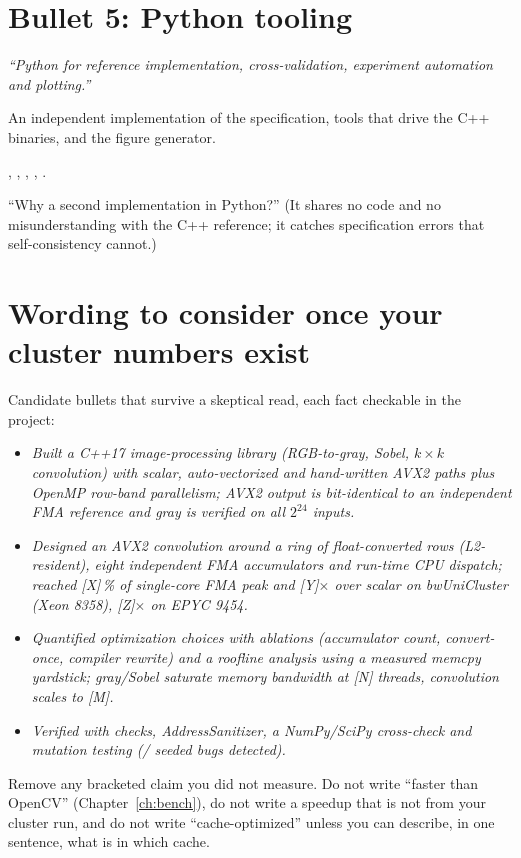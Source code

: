 \section{Bullet 5: Python tooling}
\textit{``Python for reference implementation, cross-validation, experiment automation and plotting.''}

\begin{description}[leftmargin=2.2cm,style=nextline]
\item[What] An independent implementation of the specification, tools that drive the C++ binaries, and the figure generator.
\item[Where] , , , , .
\item[Expect] ``Why a second implementation in Python?'' (It shares no code and no misunderstanding with the C++ reference; it catches specification errors that self-consistency cannot.)
\end{description}

\section{Wording to consider once your cluster numbers exist}

Candidate bullets that survive a skeptical read, each fact checkable in the project:
\begin{itemize}
\item \textit{Built a C++17 image-processing library (RGB-to-gray, Sobel, $k\times k$ convolution) with scalar, auto-vectorized and hand-written AVX2 paths plus OpenMP row-band parallelism; AVX2 output is bit-identical to an independent FMA reference and gray is verified on all $2^{24}$ inputs.}
\item \textit{Designed an AVX2 convolution around a ring of float-converted rows (L2-resident), eight independent FMA accumulators and run-time CPU dispatch; reached [X]\,\% of single-core FMA peak and [Y]$\times$ over scalar on bwUniCluster (Xeon 8358), [Z]$\times$ on EPYC 9454.}
\item \textit{Quantified optimization choices with ablations (accumulator count, convert-once, compiler rewrite) and a roofline analysis using a measured memcpy yardstick; gray/Sobel saturate memory bandwidth at [N] threads, convolution scales to [M].}
\item \textit{Verified with \testChecks{} checks, AddressSanitizer, a NumPy/SciPy cross-check and mutation testing (\mutKilled/\mutTotal{} seeded bugs detected).}
\end{itemize}
Remove any bracketed claim you did not measure. Do not write ``faster than OpenCV'' (Chapter~\ref{ch:bench}), do not write a speedup that is not from your cluster run, and do not write ``cache-optimized'' unless you can describe, in one sentence, what is in which cache.
